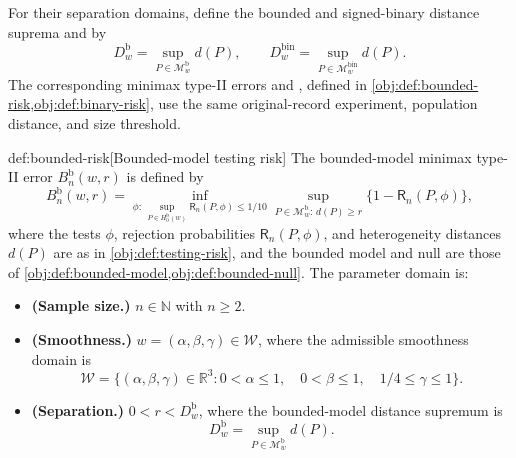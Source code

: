 For their separation domains, define the bounded and signed-binary distance suprema  and  by
\[
D_w^{\mathrm b}
=
\sup_{P\in\mathcal M^{\mathrm b}_w}d(P),
\qquad
D_w^{\mathrm{bin}}
=
\sup_{P\in\mathcal M^{\mathrm{bin}}_w}d(P).
\]
The corresponding minimax type-II errors  and , defined in \cref{obj:def:bounded-risk,obj:def:binary-risk}, use the same original-record experiment, population distance, and size threshold.

\begin{definitionv}{def:bounded-risk}[Bounded-model testing risk]
The bounded-model minimax type-II error \(B_n^{\mathrm b}(w,r)\) is defined by
\[
B_n^{\mathrm b}(w,r)
=
\inf_{\phi:\,\sup_{P\in H_0^{\mathrm b}(w)}\mathsf R_n(P,\phi)\le 1/10}
\sup_{P\in\mathcal M^{\mathrm b}_w:\,d(P)\ge r}
\{1-\mathsf R_n(P,\phi)\},
\]
where the tests \(\phi\), rejection probabilities \(\mathsf R_n(P,\phi)\), and heterogeneity distances \(d(P)\) are as in \cref{obj:def:testing-risk}, and the bounded model and null are those of \cref{obj:def:bounded-model,obj:def:bounded-null}. The parameter domain is:
\begin{itemize}
\item \textbf{(Sample size.)} \(n\in\mathbb N\) with \(n\ge2\).
\item \textbf{(Smoothness.)} \(w=(\alpha,\beta,\gamma)\in\mathcal W\), where the admissible smoothness domain is
\[
\mathcal W
=
\{(\alpha,\beta,\gamma)\in\mathbb R^3:
0<\alpha\le1,\quad 0<\beta\le1,\quad 1/4\le\gamma\le1\}.
\]
\item \textbf{(Separation.)} \(0<r<D_w^{\mathrm b}\), where the bounded-model distance supremum is
\[
D_w^{\mathrm b}
=
\sup_{P\in\mathcal M^{\mathrm b}_w}d(P).
\]
\end{itemize}
\end{definitionv}

